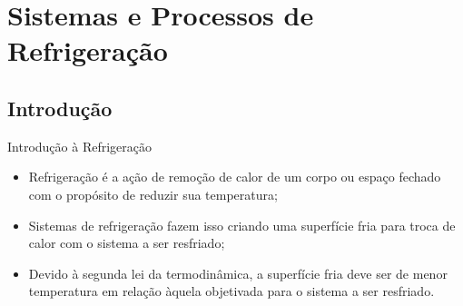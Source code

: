 \section{Sistemas e Processos de Refrigeração}

\subsection{Introdução}

    \begin{frame}{Introdução à Refrigeração}\vspace*{-0em}
        \begin{itemize}
            \item<1-> \alert{Refrigeração} é a ação de \alert{remoção de calor} de um
                \alert{corpo} ou \alert{espaço fechado} com o propósito de \alert{reduzir sua
                temperatura};
                \\[\bigskipamount]
            \item<2-> \alert{Sistemas de refrigeração} fazem isso criando uma \alert{superfície
                fria} para troca de calor com o sistema a ser resfriado;
                \\[\bigskipamount]
            \item<3-> Devido à \alert{segunda lei da termodinâmica}, a superfície fria deve ser
                de \alert{menor temperatura} em relação àquela objetivada para o sistema a ser
                resfriado.
        \end{itemize}
    \end{frame}
